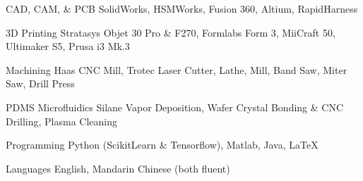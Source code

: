 


\begin{cvskills}


\cvskill
{CAD, CAM, \& PCB} %
{SolidWorks, HSMWorks, Fusion 360, Altium, RapidHarness} %


\cvskill
{3D Printing} %
{Stratasys Objet 30 Pro \& F270, Formlabs Form 3, MiiCraft 50, Ultimaker S5, Prusa i3 Mk.3} %

\cvskill
{Machining}
{Haas CNC Mill, Trotec Laser Cutter, Lathe, Mill, Band Saw, Miter Saw, Drill Press}

\cvskill
{PDMS Microfluidics}
{Silane Vapor Deposition, Wafer Crystal Bonding \& CNC Drilling, Plasma Cleaning}

\cvskill
{Programming} %
{Python (ScikitLearn \& Tensorflow), Matlab, Java, LaTeX} %

\cvskill
{Languages}
{English, Mandarin Chinese (both fluent)}


\end{cvskills}